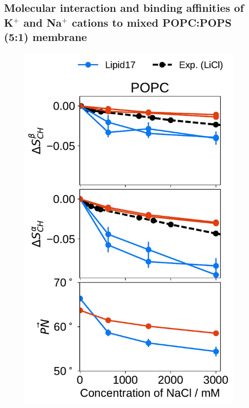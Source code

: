 \documentclass[journal=jpcbfk,manuscript=article]{achemso}
\newlength{\figheight}
\begin{document}
 


\subsection{Molecular interaction and binding affinities of K$^+$ and Na$^+$ cations to mixed POPC:POPS (5:1) membrane} 
\label{sec:affinity} 

 
 
\begin{figure}[tbp!] 
  \centering 
  \includegraphics[height=\figheight]{../img/ecc_pops/order_parameters_changes_ecc-lip_L14_A-B-PN-COO_POPC_nacl.pdf} 

\end{figure}
\end{document}
